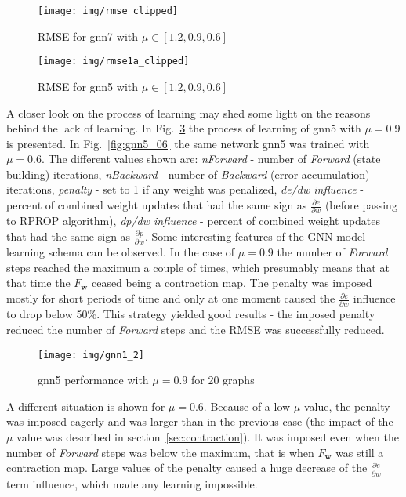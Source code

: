 \begin{figure}[h!]
\begin{center}
	\texttt{[image: img/rmse\_clipped]}
	\caption{RMSE for gnn7 with $\mu \in [1.2, 0.9, 0.6]$}
	\label{fig:gnn7}
\end{center}
\end{figure}

\begin{figure}[h!]
\begin{center}
	\texttt{[image: img/rmse1a\_clipped]}
	\caption{RMSE for gnn5 with $\mu \in [1.2, 0.9, 0.6]$}
	\label{fig:gnn5}
\end{center}
\end{figure}

A closer look on the process of learning may shed some light on the reasons behind the lack of learning. In Fig.~\ref{fig:gnn5_09} the process of learning of gnn5 with $\mu = 0.9$ is presented. In Fig.~\ref{fig:gnn5_06} the same network gnn5 was trained with $\mu = 0.6$. The different values shown are: \emph{nForward} - number of \emph{Forward} (state building) iterations, \emph{nBackward} - number of \emph{Backward} (error accumulation) iterations, \emph{penalty} - set to 1 if any weight was penalized, \emph{de/dw influence} - percent of combined weight updates that had the same sign as $\frac{\partial e}{\partial w}$ (before passing to RPROP algorithm), \emph{dp/dw influence} - percent of combined weight updates that had the same sign as $\frac{\partial p}{\partial w}$. Some interesting features of the GNN model learning schema can be observed. In the case of $\mu = 0.9$ the number of \emph{Forward} steps reached the maximum a couple of times, which presumably means that at that time the $F_{\bm{w}}$ ceased being a contraction map. The penalty was imposed mostly for short periods of time and only at one moment caused the $\frac{\partial e}{\partial w}$ influence to drop below 50\%. This strategy yielded good results - the imposed penalty reduced the number of \emph{Forward} steps and the RMSE was successfully reduced.

\begin{figure}[h!]
\begin{center}
	\texttt{[image: img/gnn1\_2]}
	\caption{gnn5 performance with $\mu = 0.9$ for 20 graphs}
	\label{fig:gnn5_09}
\end{center}
\end{figure}

A different situation is shown for $\mu = 0.6$. Because of a low $\mu$ value, the penalty was imposed eagerly and was larger than in the previous case (the impact of the $\mu$ value was described in section~\ref{sec:contraction}). It was imposed even when the number of \emph{Forward} steps was below the maximum, that is when $F_{\bm{w}}$ was still a contraction map. Large values of the penalty caused a huge decrease of the $\frac{\partial e}{\partial w}$ term influence, which made any learning impossible.

